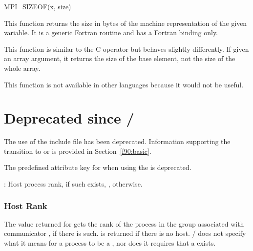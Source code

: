 \begin{funcdef}{MPI\_SIZEOF}{(\mbox{x}, \mbox{size})}
\end{funcdef}

This function returns the size in bytes of the machine representation of
the given variable. It is a generic Fortran routine and has a Fortran
binding only. 

\begin{users} 
This function is similar to the C  operator
but behaves slightly differently. If given an array argument, it 
returns the size of the base element, not the size of the
whole array.
\end{users}  

\begin{rationale}
This function is not available in other languages because it would
not be useful. 
\end{rationale}

\section{Deprecated since \texorpdfstring{\mpiivdoti/}{MPI-4.1}}

\label{sec:deprecated:since41}

\label{sec:deprecated-mpif.h}
The use of the  include file has been deprecated.
Information supporting the transition to  or  is provided in Section~\ref{f90:basic}.

\deprecatedsep
\label{sec:deprecated-mpi-host}
The predefined attribute key  for  when using the \wpm{} is deprecated.

: Host process rank, if such exists, , otherwise.

\subsubsection*{Host Rank}
The value returned for  gets the rank of the  process in the group associated
with communicator , if there is such.
 is returned if there is no host.
\MPI/ does not specify what it
means for a process to be a , nor does it requires that a 
exists.

